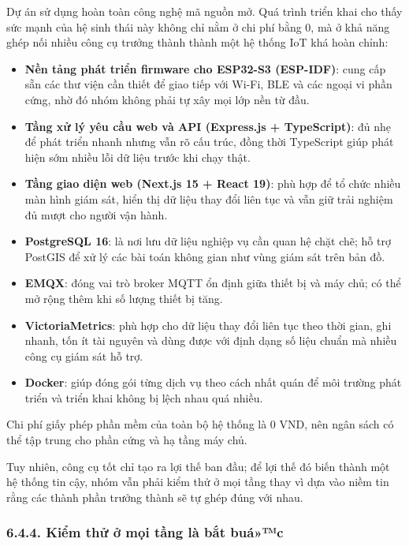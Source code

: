 \documentclass[a4paper]{extarticle}
\providecommand{\tightlist}{%
  \setlength{\itemsep}{0pt}\setlength{\parskip}{0pt}}
\begin{document}
Dự án sử dụng hoàn toàn công nghệ mã nguồn mở. Quá trình triển khai cho
thấy sức mạnh của hệ sinh thái này không chỉ nằm ở chi phí bằng 0, mà ở
khả năng ghép nối nhiều công cụ trưởng thành thành một hệ thống IoT khá
hoàn chỉnh:

\begin{itemize}
\tightlist
\item
  \textbf{Nền tảng phát triển firmware cho ESP32-S3 (ESP-IDF)}: cung cấp
  sẵn các thư viện cần thiết để giao tiếp với Wi-Fi, BLE và các ngoại vi
  phần cứng, nhờ đó nhóm không phải tự xây mọi lớp nền từ đầu.
\item
  \textbf{Tầng xử lý yêu cầu web và API (Express.js + TypeScript)}: đủ
  nhẹ để phát triển nhanh nhưng vẫn rõ cấu trúc, đồng thời TypeScript
  giúp phát hiện sớm nhiều lỗi dữ liệu trước khi chạy thật.
\item
  \textbf{Tầng giao diện web (Next.js 15 + React 19)}: phù hợp để tổ
  chức nhiều màn hình giám sát, hiển thị dữ liệu thay đổi liên tục và
  vẫn giữ trải nghiệm đủ mượt cho người vận hành.
\item
  \textbf{PostgreSQL 16}: là nơi lưu dữ liệu nghiệp vụ cần quan hệ chặt
  chẽ; hỗ trợ PostGIS để xử lý các bài toán không gian như vùng giám sát
  trên bản đồ.
\item
  \textbf{EMQX}: đóng vai trò broker MQTT ổn định giữa thiết bị và máy
  chủ; có thể mở rộng thêm khi số lượng thiết bị tăng.
\item
  \textbf{VictoriaMetrics}: phù hợp cho dữ liệu thay đổi liên tục theo
  thời gian, ghi nhanh, tốn ít tài nguyên và dùng được với định dạng số
  liệu chuẩn mà nhiều công cụ giám sát hỗ trợ.
\item
  \textbf{Docker}: giúp đóng gói từng dịch vụ theo cách nhất quán để môi
  trường phát triển và triển khai không bị lệch nhau quá nhiều.
\end{itemize}

Chi phí giấy phép phần mềm của toàn bộ hệ thống là 0 VND, nên ngân sách
có thể tập trung cho phần cứng và hạ tầng máy chủ.

Tuy nhiên, công cụ tốt chỉ tạo ra lợi thế ban đầu; để lợi thế đó biến
thành một hệ thống tin cậy, nhóm vẫn phải kiểm thử ở mọi tầng thay vì
dựa vào niềm tin rằng các thành phần trưởng thành sẽ tự ghép đúng với
nhau.

\subsubsection{6.4.4. Kiểm thử ở mọi tầng là bắt
buá»™c}\label{644-kiux1ec3m-thux1eed-ux1edf-mux1ecdi-tux1ea7ng-luxe0-bux1eaft-buux1ed9c}
\end{document}
